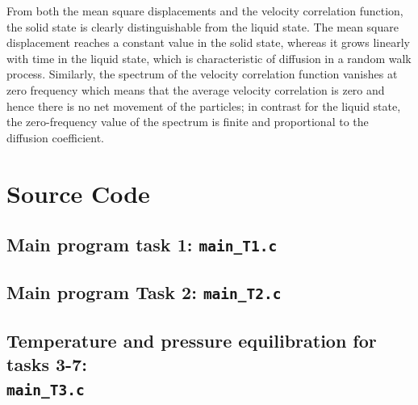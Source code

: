 From both the mean square displacements and the velocity correlation function, the solid state is 
clearly distinguishable from the liquid state. The mean square displacement reaches a constant value in the solid state, whereas it grows linearly with time in the liquid state, which is characteristic of diffusion in a random walk process. Similarly, the spectrum of the velocity correlation function vanishes at zero frequency which means that the average velocity correlation is zero and hence there is no net movement of the particles; in contrast for the liquid state, the zero-frequency value of the spectrum is finite and proportional to the diffusion coefficient. 
\newpage

\appendix

\section{Source Code}

%

%

\subsection{Main program task 1: \texttt{main\_T1.c}}


\subsection{Main program  Task 2: \texttt{main\_T2.c}}


\subsection{Temperature and pressure equilibration for tasks 3-7:\\ \texttt{main\_T3.c}}


